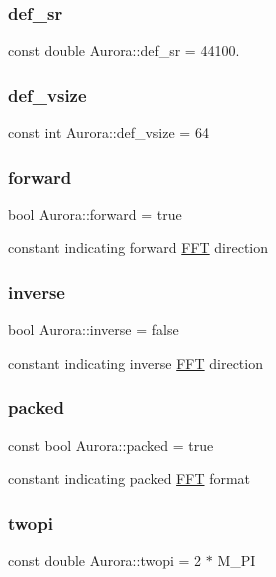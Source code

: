\subsubsection{\texorpdfstring{def\+\_\+sr}{def\_sr}}
{\footnotesize\ttfamily const double Aurora\+::def\+\_\+sr = 44100.}

\mbox{\label{namespace_aurora_afaaddf667a06e7ce23c667a8b7295263}} 
\subsubsection{\texorpdfstring{def\+\_\+vsize}{def\_vsize}}
{\footnotesize\ttfamily const int Aurora\+::def\+\_\+vsize = 64}

\mbox{\label{namespace_aurora_a20b1bd3f1b34b8676e26d07718dac352}} 
\subsubsection{\texorpdfstring{forward}{forward}}
{\footnotesize\ttfamily bool Aurora\+::forward = true\hspace{0.3cm}{\ttfamily [static]}}

constant indicating forward \hyperlink{class_aurora_1_1_f_f_t}{F\+FT} direction \mbox{\label{namespace_aurora_ac22c4e2e10572cbb6f64f3bd1cd595b5}} 
\subsubsection{\texorpdfstring{inverse}{inverse}}
{\footnotesize\ttfamily bool Aurora\+::inverse = false\hspace{0.3cm}{\ttfamily [static]}}

constant indicating inverse \hyperlink{class_aurora_1_1_f_f_t}{F\+FT} direction \mbox{\label{namespace_aurora_a3e70ffc9ea5c526dcd66b1b14e43f175}} 
\subsubsection{\texorpdfstring{packed}{packed}}
{\footnotesize\ttfamily const bool Aurora\+::packed = true}

constant indicating packed \hyperlink{class_aurora_1_1_f_f_t}{F\+FT} format \mbox{\label{namespace_aurora_a4c08f8416c2b35d5001062f121459b5a}} 
\subsubsection{\texorpdfstring{twopi}{twopi}}
{\footnotesize\ttfamily const double Aurora\+::twopi = 2 $\ast$ M\+\_\+\+PI}


